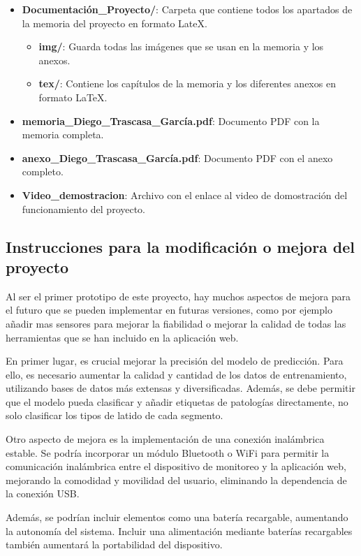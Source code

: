 \begin{itemize}
    \item 
    \textbf{Documentación\_Proyecto/}: Carpeta que contiene todos los apartados de la memoria del proyecto en formato LateX.
    \begin{itemize}
        \item \textbf{img/}: Guarda todas las imágenes que se usan en la memoria y los anexos.
        \item \textbf{tex/}: Contiene los capítulos de la memoria y los diferentes anexos en formato LaTeX.
    \end{itemize}

    \item \textbf{memoria\_Diego\_Trascasa\_García.pdf}: Documento PDF con la memoria completa.
    \item \textbf{anexo\_Diego\_Trascasa\_García.pdf}: Documento PDF con el anexo completo.
    
    \item \textbf{Video\_demostracion}: Archivo con el enlace al video de domostración del funcionamiento del proyecto.
\end{itemize}


\subsection{Instrucciones para la modificación o mejora del proyecto}

Al ser el primer prototipo de este proyecto, hay muchos aspectos de mejora para el futuro que se pueden implementar en futuras versiones, como por ejemplo añadir mas sensores para mejorar la fiabilidad o mejorar la calidad de todas las herramientas que se han incluido en la aplicación web.

En primer lugar, es crucial mejorar la precisión del modelo de predicción. Para ello, es necesario aumentar la calidad y cantidad de los datos de entrenamiento, utilizando bases de datos más extensas y diversificadas. Además, se debe permitir que el modelo pueda clasificar y añadir etiquetas de patologías directamente, no solo clasificar los tipos de latido de cada segmento.

Otro aspecto de mejora es la implementación de una conexión inalámbrica estable. Se podría incorporar un módulo Bluetooth o WiFi para permitir la comunicación inalámbrica entre el dispositivo de monitoreo y la aplicación web, mejorando la comodidad y movilidad del usuario, eliminando la dependencia de la conexión USB.

Además, se podrían incluir elementos como una batería recargable, aumentando la autonomía del sistema. Incluir una alimentación mediante baterías recargables también aumentará la portabilidad del dispositivo.

